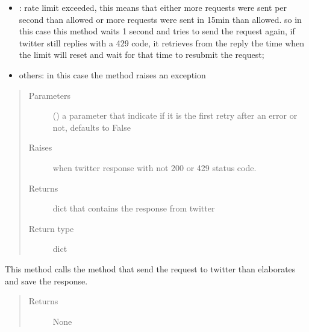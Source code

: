 \documentclass[letterpaper,10pt,english]{sphinxmanual}
\begin{document}
\begin{fulllineitems}
\begin{fulllineitems}
\begin{itemize}
\item {} 
: rate limit exceeded, this means that either more requests were sent per second than allowed or more requests were sent in 15min than allowed. so in this case this method waits 1 second and tries to send the request again,  if twitter still replies with a 429 code, it retrieves from the reply the time when the limit will reset and wait for that time to resubmit the request;

\item {} 
\sphinxAtStartPar
others: in this case the method raises an exception

\end{itemize}
\begin{quote}\begin{description}
\item[{Parameters}] \leavevmode
\sphinxAtStartPar
{} (\sphinxstyleliteralemphasis{\sphinxupquote{, }}) \textendash{} a parameter that indicate if it is the first retry after an error or not, defaults to False

\item[{Raises}] \leavevmode
\sphinxAtStartPar
{} \textendash{} when twitter response with not 200 or 429 status code.

\item[{Returns}] \leavevmode
\sphinxAtStartPar
dict that contains the response from twitter

\item[{Return type}] \leavevmode
\sphinxAtStartPar
dict

\end{description}\end{quote}

\end{fulllineitems}


\begin{fulllineitems}
\label{\detokenize{code_comment/user_search:hate_tweet_map.users_searcher.SearchUsers.UserSearch.__make}}
\sphinxAtStartPar
This method calls the method that send the request to twitter than elaborates and save the response.
\begin{quote}\begin{description}
\item[{Returns}] \leavevmode
\sphinxAtStartPar
None


\end{description}
\end{quote}
\end{fulllineitems}
\end{fulllineitems}
\end{document}
